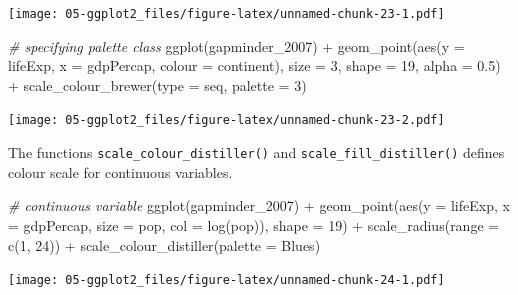 \documentclass[
]{book}
\newenvironment{Shaded}{\begin{snugshade}}{\end{snugshade}}
\newcommand{\AttributeTok}[1]{\textcolor[rgb]{0.77,0.63,0.00}{#1}}
\newcommand{\CommentTok}[1]{\textcolor[rgb]{0.56,0.35,0.01}{\textit{#1}}}
\newcommand{\DecValTok}[1]{\textcolor[rgb]{0.00,0.00,0.81}{#1}}
\newcommand{\FloatTok}[1]{\textcolor[rgb]{0.00,0.00,0.81}{#1}}
\newcommand{\FunctionTok}[1]{\textcolor[rgb]{0.00,0.00,0.00}{#1}}
\newcommand{\NormalTok}[1]{#1}
\newcommand{\SpecialCharTok}[1]{\textcolor[rgb]{0.00,0.00,0.00}{#1}}
\newcommand{\StringTok}[1]{\textcolor[rgb]{0.31,0.60,0.02}{#1}}
\begin{document}
\texttt{[image: 05-ggplot2\_files/figure-latex/unnamed-chunk-23-1.pdf]}

\begin{Shaded}
\begin{Highlighting}[]
\CommentTok{\# specifying palette class}
\FunctionTok{ggplot}\NormalTok{(gapminder\_2007) }\SpecialCharTok{+} 
  \FunctionTok{geom\_point}\NormalTok{(}\FunctionTok{aes}\NormalTok{(}\AttributeTok{y =}\NormalTok{ lifeExp, }\AttributeTok{x =}\NormalTok{ gdpPercap, }\AttributeTok{colour =}\NormalTok{ continent), }\AttributeTok{size =} \DecValTok{3}\NormalTok{, }\AttributeTok{shape =} \DecValTok{19}\NormalTok{, }
             \AttributeTok{alpha =} \FloatTok{0.5}\NormalTok{) }\SpecialCharTok{+}
  \FunctionTok{scale\_colour\_brewer}\NormalTok{(}\AttributeTok{type =} \StringTok{\textquotesingle{}seq\textquotesingle{}}\NormalTok{, }\AttributeTok{palette =} \DecValTok{3}\NormalTok{)}
\end{Highlighting}
\end{Shaded}

\texttt{[image: 05-ggplot2\_files/figure-latex/unnamed-chunk-23-2.pdf]}

The functions \texttt{scale\_colour\_distiller()} and \texttt{scale\_fill\_distiller()} defines colour scale for continuous variables.

\begin{Shaded}
\begin{Highlighting}[]
\CommentTok{\# continuous variable}
\FunctionTok{ggplot}\NormalTok{(gapminder\_2007) }\SpecialCharTok{+} 
  \FunctionTok{geom\_point}\NormalTok{(}\FunctionTok{aes}\NormalTok{(}\AttributeTok{y =}\NormalTok{ lifeExp, }\AttributeTok{x =}\NormalTok{ gdpPercap, }\AttributeTok{size =}\NormalTok{ pop, }\AttributeTok{col =} \FunctionTok{log}\NormalTok{(pop)), }\AttributeTok{shape =} \DecValTok{19}\NormalTok{) }\SpecialCharTok{+}
  \FunctionTok{scale\_radius}\NormalTok{(}\AttributeTok{range =} \FunctionTok{c}\NormalTok{(}\DecValTok{1}\NormalTok{, }\DecValTok{24}\NormalTok{)) }\SpecialCharTok{+}
  \FunctionTok{scale\_colour\_distiller}\NormalTok{(}\AttributeTok{palette =} \StringTok{\textquotesingle{}Blues\textquotesingle{}}\NormalTok{)}
\end{Highlighting}
\end{Shaded}

\texttt{[image: 05-ggplot2\_files/figure-latex/unnamed-chunk-24-1.pdf]}
\end{document}
